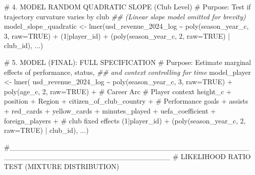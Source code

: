 \documentclass[
  12pt,
]{article}
\newenvironment{Shaded}{\begin{snugshade}}{\end{snugshade}}
\newcommand{\AlertTok}[1]{\textcolor[rgb]{0.68,0.00,0.00}{#1}}
\newcommand{\AttributeTok}[1]{\textcolor[rgb]{0.40,0.45,0.13}{#1}}
\newcommand{\CommentTok}[1]{\textcolor[rgb]{0.37,0.37,0.37}{#1}}
\newcommand{\ConstantTok}[1]{\textcolor[rgb]{0.56,0.35,0.01}{#1}}
\newcommand{\DecValTok}[1]{\textcolor[rgb]{0.68,0.00,0.00}{#1}}
\newcommand{\DocumentationTok}[1]{\textcolor[rgb]{0.37,0.37,0.37}{\textit{#1}}}
\newcommand{\FunctionTok}[1]{\textcolor[rgb]{0.28,0.35,0.67}{#1}}
\newcommand{\NormalTok}[1]{\textcolor[rgb]{0.00,0.23,0.31}{#1}}
\newcommand{\OtherTok}[1]{\textcolor[rgb]{0.00,0.23,0.31}{#1}}
\newcommand{\SpecialCharTok}[1]{\textcolor[rgb]{0.37,0.37,0.37}{#1}}
\begin{document}
\begin{Shaded}
\begin{Highlighting}[]
\CommentTok{\# 4. MODEL RANDOM QUADRATIC SLOPE (Club Level)}
\CommentTok{\# Purpose: Test if trajectory curvature varies by club }
\DocumentationTok{\#\# (Linear slope model omitted for brevity)}
\NormalTok{model\_slope\_quadratic }\OtherTok{\textless{}{-}} \FunctionTok{lmer}\NormalTok{(usd\_revenue\_2024\_log }\SpecialCharTok{\textasciitilde{}} 
                                \FunctionTok{poly}\NormalTok{(season\_year\_c, }\DecValTok{3}\NormalTok{, }\AttributeTok{raw=}\ConstantTok{TRUE}\NormalTok{) }\SpecialCharTok{+} 
\NormalTok{                                (}\DecValTok{1}\SpecialCharTok{|}\NormalTok{player\_id) }\SpecialCharTok{+} 
\NormalTok{                                (}\FunctionTok{poly}\NormalTok{(season\_year\_c, }\DecValTok{2}\NormalTok{, }\AttributeTok{raw=}\ConstantTok{TRUE}\NormalTok{) }\SpecialCharTok{|}\NormalTok{ club\_id), }
\NormalTok{                              ...)}

\CommentTok{\# 5. MODEL (FINAL): FULL SPECIFICATION}
\CommentTok{\# Purpose: Estimate marginal effects of performance, status, }
\DocumentationTok{\#\# and context controlling for time}
\NormalTok{model\_player }\OtherTok{\textless{}{-}} \FunctionTok{lmer}\NormalTok{(}
\NormalTok{  usd\_revenue\_2024\_log }\SpecialCharTok{\textasciitilde{}} 
    \FunctionTok{poly}\NormalTok{(season\_year\_c, }\DecValTok{3}\NormalTok{, }\AttributeTok{raw=}\ConstantTok{TRUE}\NormalTok{) }\SpecialCharTok{+}          
    \FunctionTok{poly}\NormalTok{(age\_c, }\DecValTok{2}\NormalTok{, }\AttributeTok{raw=}\ConstantTok{TRUE}\NormalTok{) }\SpecialCharTok{+}                  \CommentTok{\# Career Arc}
    \CommentTok{\# Player context}
\NormalTok{    height\_c }\SpecialCharTok{+}\NormalTok{ position }\SpecialCharTok{+}\NormalTok{ Region }\SpecialCharTok{+}\NormalTok{ citizen\_of\_club\_country }\SpecialCharTok{+} 
    \CommentTok{\# Performance}
\NormalTok{    goals }\SpecialCharTok{+}\NormalTok{ assists }\SpecialCharTok{+}\NormalTok{ red\_cards }\SpecialCharTok{+}\NormalTok{ yellow\_cards }\SpecialCharTok{+}\NormalTok{ minutes\_played }\SpecialCharTok{+} 
\NormalTok{    uefa\_coefficient }\SpecialCharTok{+}\NormalTok{ foreign\_players }\SpecialCharTok{+}        \CommentTok{\# club fixed effects}
\NormalTok{    (}\DecValTok{1}\SpecialCharTok{|}\NormalTok{player\_id) }\SpecialCharTok{+}\NormalTok{ (}\FunctionTok{poly}\NormalTok{(season\_year\_c, }\DecValTok{2}\NormalTok{, }\AttributeTok{raw=}\ConstantTok{TRUE}\NormalTok{) }\SpecialCharTok{|}\NormalTok{ club\_id), }
\NormalTok{    ...)}

\CommentTok{\#\_\_\_\_\_\_\_\_\_\_\_\_\_\_\_\_\_\_\_\_\_\_\_\_\_\_\_\_\_\_\_\_\_\_\_\_\_\_\_\_\_\_\_\_\_\_\_\_\_\_\_\_\_\_\_\_\_\_\_\_\_\_\_\_\_\_\_\_\_\_\_\_\_\_\_\_\_\_}
\CommentTok{\# LIKELIHOOD RATIO }\AlertTok{TEST}\CommentTok{ (MIXTURE DISTRIBUTION)}


\end{Highlighting}
\end{Shaded}
\end{document}
